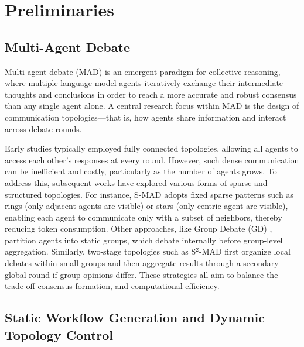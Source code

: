 \section{Preliminaries}
\subsection{Multi-Agent Debate}
Multi-agent debate (MAD) is an emergent paradigm for collective reasoning, where multiple language model agents iteratively exchange their intermediate thoughts and conclusions in order to reach a more accurate and robust consensus than any single agent alone. A central research focus within MAD is the design of communication topologies—that is, how agents share information and interact across debate rounds.

Early studies typically employed fully connected topologies, allowing all agents to access each other's responses at every round. However, such dense communication can be inefficient and costly, particularly as the number of agents grows. To address this, subsequent works have explored various forms of sparse and structured topologies. For instance, S-MAD \citep{li2024improving} adopts fixed sparse patterns such as rings (only adjacent agents are visible) or stars (only centric agent are visible), enabling each agent to communicate only with a subset of neighbors, thereby reducing token consumption. Other approaches, like Group Debate (GD) \citep{liu2024groupdebate}, partition agents into static groups, which debate internally before group-level aggregation. Similarly, two-stage topologies such as S$^2$-MAD \citep{zeng2025s} first organize local debates within small groups and then aggregate results through a secondary global round if group opinions differ. These strategies all aim to balance the trade-off consensus formation, and computational efficiency.

\subsection{Static Workflow Generation and Dynamic Topology Control}


